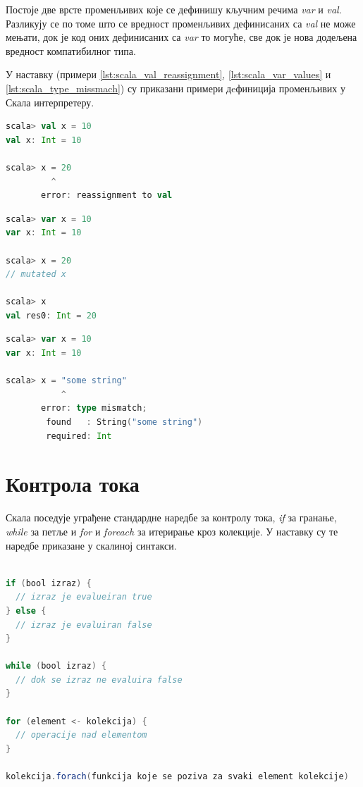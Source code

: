 \documentclass[12pt,oneside]{memoir}
\begin{document}
Постоје две врсте променљивих које се дефинишу кључним речима \textit{var} и \textit{val}. Разликују се по томе што се вредност променљивих дефинисаних са \textit{val} не може мењати, док је код оних дефинисаних са \textit{var} то могуће, све док је нова додељена вредност компатибилног типа. \cite{scala_prog}

У наставку (примери \ref{lst:scala_val_reassignment}, \ref{lst:scala_var_values} и \ref{lst:scala_type_missmach}) су приказани примери дeфиниција променљивих у Скала интерпретеру.

\begin{lstlisting}[language=Scala, caption={Додељивање нове вредности val променљивима}, label={lst:scala_val_reassignment}]
scala> val x = 10
val x: Int = 10

scala> x = 20
         ^
       error: reassignment to val
\end{lstlisting}

\begin{lstlisting}[language=Scala, caption={Додељивање нове вредности var променљивима}, label={lst:scala_var_values}]
scala> var x = 10
var x: Int = 10

scala> x = 20
// mutated x

scala> x
val res0: Int = 20

\end{lstlisting}

\begin{lstlisting}[language=Scala, caption={Додељивање некомпатибилног типа}, label={lst:scala_type_missmach}]
scala> var x = 10
var x: Int = 10

scala> x = "some string"
           ^
       error: type mismatch;
        found   : String("some string")
        required: Int
\end{lstlisting}

\section{Контрола тока}
\label{sec:scala_kontr_toka}

Скала поседује уграђене стандардне наредбе за контролу тока, \textit{if} за гранање, \textit{while} за петље и \textit{for} и \textit{foreach} за итерирање кроз колекције. У наставку су те наредбе приказане у скалиној синтакси. \cite{scala_prog}

\begin{lstlisting}[language=Scala, caption={Контрола тока}, label={lst:scala_flow_control}]

if (bool izraz) {
  // izraz je evalueiran true
} else {
  // izraz je evaluiran false
}

while (bool izraz) {
  // dok se izraz ne evaluira false
}

for (element <- kolekcija) {
  // operacije nad elementom
}

kolekcija.forach(funkcija koje se poziva za svaki element kolekcije)

\end{lstlisting}
\end{document}

